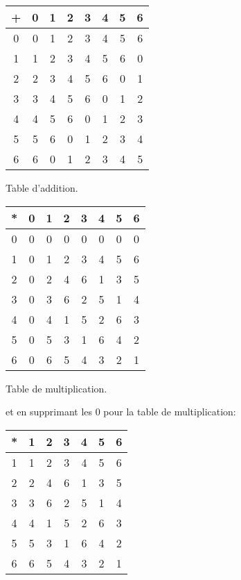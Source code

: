 \begin{minipage}{0.5\textwidth}
  \begin{center}
\begin{tabular}{c|ccccccc}
+&0&1&2&3&4&5&6\\
\hline
0&0&1&2&3&4&5&6\\
1&1&2&3&4&5&6&0\\
2&2&3&4&5&6&0&1\\
3&3&4&5&6&0&1&2\\
4&4&5&6&0&1&2&3\\
5&5&6&0&1&2&3&4\\
6&6&0&1&2&3&4&5\\
\end{tabular}
\smallskip

Table d'addition.
\end{center}
\end{minipage}
\begin{minipage}{0.5\textwidth}
  \begin{center}
\begin{tabular}{c|ccccccc}
*&0&1&2&3&4&5&6\\
\hline
0&0&0&0&0&0&0&0\\
1&0&1&2&3&4&5&6\\
2&0&2&4&6&1&3&5\\
3&0&3&6&2&5&1&4\\
4&0&4&1&5&2&6&3\\
5&0&5&3&1&6&4&2\\
6&0&6&5&4&3&2&1\\
\end{tabular}
\smallskip

Table de multiplication.
\end{center}
\end{minipage}
\medskip

et en supprimant les $0$ pour la table de multiplication:

\begin{center}
\begin{tabular}{c|cccccc}
*&1&2&3&4&5&6\\
\hline
1&1&2&3&4&5&6\\
2&2&4&6&1&3&5\\
3&3&6&2&5&1&4\\
4&4&1&5&2&6&3\\
5&5&3&1&6&4&2\\
6&6&5&4&3&2&1\\
\end{tabular}
\end{center}

